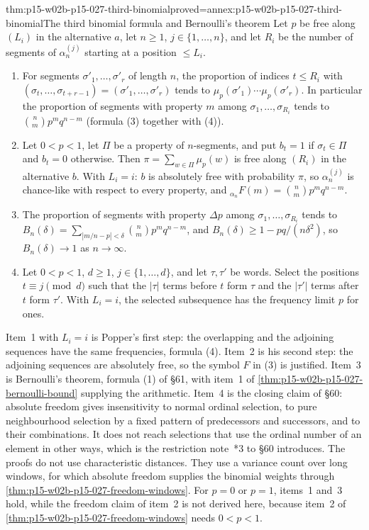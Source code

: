 \begin{hbtheorem}{thm:p15-w02b-p15-027-third-binomial}{proved=annex:p15-w02b-p15-027-third-binomial}{The third binomial formula and Bernoulli's theorem}
Let \(p\) be free along \((L_i)\) in the alternative \(a\), let
\(n\geq1\), \(j\in\{1,\ldots,n\}\), and let \(R_i\) be the number of
segments of \(\alpha_n^{(j)}\) starting at a position \(\leq L_i\).
\begin{enumerate}
\item For segments \(\sigma'_1,\ldots,\sigma'_r\) of length \(n\), the
  proportion of indices \(t\leq R_i\) with
  \((\sigma_t,\ldots,\sigma_{t+r-1})=(\sigma'_1,\ldots,\sigma'_r)\) tends
  to \(\mu_p(\sigma'_1)\cdots\mu_p(\sigma'_r)\). In particular the
  proportion of segments with property \(m\) among
  \(\sigma_1,\ldots,\sigma_{R_i}\) tends to \(\binom nm p^mq^{n-m}\)
  (formula (3) together with (4)).
\item Let \(0<p<1\), let \(\Pi\) be a property of \(n\)-segments, and put
  \(b_t=1\) if \(\sigma_t\in\Pi\) and \(b_t=0\) otherwise. Then
  \(\pi=\sum_{w\in\Pi}\mu_p(w)\) is free along \((R_i)\) in the
  alternative \(b\). With \(L_i=i\): \(b\) is absolutely free with
  probability \(\pi\), so \(\alpha_n^{(j)}\) is chance-like with respect
  to every property, and \({}_{\alpha_n}F(m)=\binom nm p^mq^{n-m}\).
\item The proportion of segments with property \(\Delta p\) among
  \(\sigma_1,\ldots,\sigma_{R_i}\) tends to
  \(B_n(\delta)=\sum_{|m/n-p|<\delta}\binom nm p^mq^{n-m}\), and
  \(B_n(\delta)\geq1-pq/(n\delta^2)\), so \(B_n(\delta)\to1\) as
  \(n\to\infty\).
\item Let \(0<p<1\), \(d\geq1\), \(j\in\{1,\ldots,d\}\), and let
  \(\tau,\tau'\) be words. Select the positions \(t\equiv j\pmod d\)
  such that the \(|\tau|\) terms before \(t\) form \(\tau\) and the
  \(|\tau'|\) terms after \(t\) form \(\tau'\). With \(L_i=i\), the
  selected subsequence has the frequency limit \(p\) for ones.
\end{enumerate}
\end{hbtheorem}

Item~1 with \(L_i=i\) is Popper's first step: the overlapping and the
adjoining sequences have the same frequencies, formula (4). Item~2 is
his second step: the adjoining sequences are absolutely free, so the
symbol \(F\) in (3) is justified. Item~3 is Bernoulli's theorem, formula
(1) of \S61, with item~1 of \cref{thm:p15-w02b-p15-027-bernoulli-bound}
supplying the arithmetic. Item~4 is the closing claim of \S60: absolute
freedom gives insensitivity to normal ordinal selection, to pure
neighbourhood selection by a fixed pattern of predecessors and
successors, and to their combinations. It does not reach selections
that use the ordinal number of an element in other ways, which is the
restriction note~*3 to \S60 introduces. The proofs do not use
characteristic distances. They use a variance count over long windows,
for which absolute freedom supplies the binomial weights through
\cref{thm:p15-w02b-p15-027-freedom-windows}. For \(p=0\) or \(p=1\), items~1
and~3 hold, while the freedom claim of item~2 is not derived here,
because item~2 of \cref{thm:p15-w02b-p15-027-freedom-windows} needs
\(0<p<1\).

